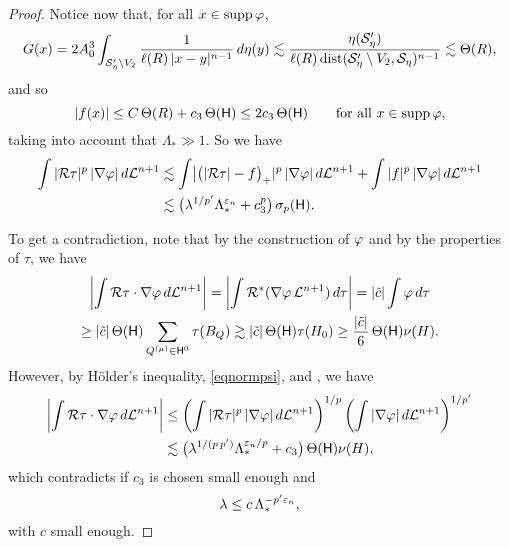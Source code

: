 \begin{proof}
Notice now that, for all $x\in \operatorname{supp}{\varphi}$,
$$G(x) = 2A_0^3\int_{{\mathcal S}_\eta'\setminus V_2} 
 \frac1{\ell(R)\,|x-y|^{n-1}}\,d\eta(y) \lesssim \frac{\eta({\mathcal S}_\eta')}{\ell(R)\,{\rm dist}({\mathcal S}_\eta'\setminus V_2, {\mathcal S}_\eta)^{n-1}} \lesssim \Theta(R),$$
and so
$$|f(x)|\leq C\, \Theta(R) + c_3\,\Theta({\mathsf{H}})\leq 2c_3\,\Theta({\mathsf{H}}) \qquad\mbox{for all $x\in \operatorname{supp}{\varphi}$,}$$ 
taking into account that $\Lambda_*\gg1$.
So we have
\begin{align}\label{eqcont4}
\int |{\mathcal R}\tau|^p\,|\nabla{\varphi}|\,d{\mathcal L}^{n+1} &\lesssim \int \bigl|\bigl(|{\mathcal R}\tau| - f\bigr)_+|^p\,|\nabla{\varphi}|\,d{\mathcal L}^{n+1}
+ \int |f|^p\,|\nabla{\varphi}|\,d{\mathcal L}^{n+1}\\
& \lesssim 
  \bigl(\lambda^{1/p'}\Lambda_*^{{\varepsilon}_n} + c_3^p\bigr)\,\sigma_p({\mathsf{H}}).\nonumber
\end{align}

To get a contradiction, note that by the construction of ${\varphi}$ and by the properties of $\tau$, we have
\begin{multline}\label{eqprev}
\left|\int {\mathcal R}\tau\cdot\nabla{\varphi}\,d{\mathcal L}^{n+1}\right| = \left|\int {\mathcal R}^*(\nabla{\varphi}\,{\mathcal L}^{n+1})\,d\tau \right|=  
|\tilde c| \int {\varphi}\,d\tau\\
\ge |\tilde c|\,
\Theta({\mathsf{H}}) \sum_{Q^{(\mu)}\in{\mathsf{H}}^0} \tau(B_Q) \gtrsim |\tilde c|\,
\Theta({\mathsf{H}}) \tau(H_0)\geq \frac{|\tilde c|}6\,
 \Theta({\mathsf{H}}) \nu(H).
 \end{multline}
However, by H\"older's inequality, \eqref{eqnormpsi}, and , we have
\begin{align*}%
\left|\int \RR\tau\cdot\nabla\vphi\,d\LL^{n+1}\right| & \leq \left(\int |\RR\tau|^p \,|\nabla\vphi|\,d\LL^{n+1} \right)^{1/p}
\left(\int |\nabla\vphi|\,d\LL^{n+1}\right)^{1/p'} \\
&\lesssim \bigl(\lambda^{1/(p\,p')} \Lambda_*^{\ve_n/p}+ c_3\bigr)
\, \Theta(\sH)\nu(H),
\end{align*}
which contradicts  if $c_3$ is chosen small enough and 
$$\lambda\leq c\,\Lambda_*^{-p'{\varepsilon}_n},$$
with $c$ small enough.
\end{proof}


\vv

